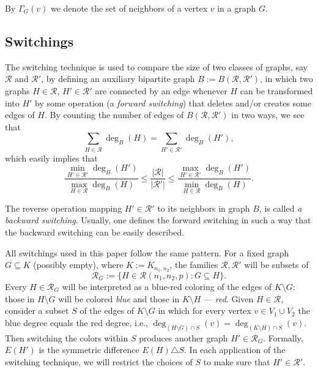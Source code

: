 \documentclass[12pt,reqno]{amsart}
\newcommand{\rc}{{\mathcal{R}}}
\newcommand{\Knn} {K_{n_1,n_2}}
\theoremstyle{definition}
\begin{document}
By $\Gamma_{G}(v)$ we denote the set of neighbors of a vertex $v$ in a graph $G$.


\subsection{Switchings}
\label{ss_switchings}
The switching technique is used to compare the size of two classes of graphs, say $\rc$ and $\rc'$, by defining an auxiliary bipartite graph $B:=B(\rc,\rc')$, in which two graphs $H \in \rc$, $H' \in \rc'$ are connected by an edge whenever $H$ can be transformed into $H'$ by some operation (a \emph{forward switching}) that deletes and/or creates some edges of $H$.
By counting the number of edges of $B(\rc,\rc')$ in two ways, we see that
\begin{equation}
  \label{eq_BRR}
	\sum_{H\in\rc}\deg_B(H) = \sum_{H'\in\rc'}\deg_B(H'),
\end{equation}
which easily implies that
\begin{equation}
  \label{eq_countingedges}
\frac{\min_{H' \in \rc'} \deg_B(H')}{\max_{H \in \rc} \deg_B(H)} \le \frac{|\rc|}{|\rc'|} \le \frac{\max_{H' \in \rc'} \deg_B(H')}{\min_{H \in \rc} \deg_B(H)}.
\end{equation}


The reverse operation mapping $H' \in \rc'$ to its neighbors in graph $B$, is called \emph{a backward switching}. Usually, one defines the forward switching in such a way that the backward switching can be easily described.


All switchings used in this paper follow the same pattern. For a fixed  graph $G \subseteq K$ (possibly empty), where $K := \Knn$, the families $\rc, \rc'$ will be subsets of
\begin{equation}
  \label{eq_rcG}
  \rc_G := \{ H \in \rc(n_1,n_2,p) : G \subseteq H \}.
\end{equation}
Every  $H \in \rc_G$ will be interpreted as a blue-red coloring of the edges of $K\setminus G$: those in $H\setminus G$ will be colored \emph{blue} and those in $K \setminus H$ --- \emph{red}. Given $H\in\rc$, consider a subset $S$ of the edges of $K\setminus G$ in which for every vertex $v \in V_1 \cup V_2$ the blue degree equals the red degree, i.e., $\deg_{(H\setminus G)\cap S}(v)=\deg_{(K\setminus H)\cap S}(v)$. Then switching the colors within $S$ produces another graph $H' \in \rc_G$. Formally, $E(H')$ is the symmetric difference $E(H) \triangle S$.
In each application of the switching technique, we will restrict the choices of $S$ to make sure that $H' \in \rc'$.
\end{document}
